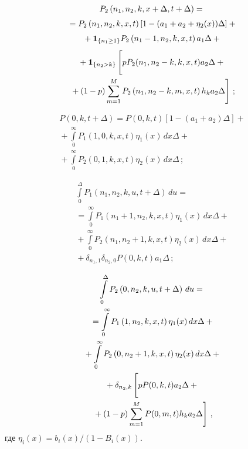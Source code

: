 \begin{multicols}{2}
\vspace*{-10pt}

\noindent
\begin{multline}
P_2\left(n_1,n_2,k,x+\Delta,t+\Delta\right)={}\\[3pt]
{}=
P_2\left(n_1,n_2,k,x,t\right)\left[1-(a_1+a_2+\eta_2(x))\Delta\right]+{}\\[3pt]
{}+\mathbf{1}_{\{n_1\geq 1\}}P_2\left(n_1-1,n_2,k,x,t\right)a_1\Delta+{}\\[3pt]
{}+\mathbf{1}_{\{n_2>k\}}\left[
\vphantom{\sum\limits_{m=1}^{M}}
pP_2(n_1,n_2-k,k,x,t)a_2\Delta+{}\right.\\
\left.{}+(1-p)
\sum\limits_{m=1}^{M}P_2\left(n_1,n_2-k,m,x,t\right)h_k a_2\Delta\right]\,;
\label{before2}
\end{multline}

\vspace*{-10pt}

\noindent
\begin{multline}
P\left(0,k,t+\Delta\right)=
P(0,k,t)\left[1-\left(a_1+a_2\right)\Delta\right]+{}\\
{}+
\int\limits_0^{\infty}P_1(1,0,k,x,t)\eta_1(x)\,dx\Delta+{}\\
{}+\int\limits_0^{\infty}P_2(0,1,k,x,t)\eta_2(x)\,dx\Delta\,;
\label{before3}
\end{multline}

\vspace*{-10pt}

\noindent
\begin{multline}
\int\limits_0^\Delta P_1\left(n_1,n_2,k,u,t+\Delta\right)\,du={}\\
{}=
\int\limits_0^{\infty}P_1\left(n_1+1,n_2,k,x,t\right)\eta_1(x)\,dx\Delta+{}\\
{}+\int\limits_0^{\infty}P_2\left(n_1,n_2+1,k,x,t\right)\eta_2(x)\,dx\Delta+{}\\
{}+
\delta_{n_1,1}\delta_{n_2,0}P(0,k,t)a_1\Delta\,;
\label{before4}
\end{multline}


\noindent
\begin{multline}
\int\limits_0^\Delta P_2\left(0,n_2,k,u,t+\Delta\right)\,du={}\\
{}=
\int\limits_0^{\infty}P_1\left(1,n_2,k,x,t\right)\eta_1(x)\,dx\Delta+{}
\\
{}+\int\limits_0^{\infty}P_2\left(0,n_2+1,k,x,t\right)\eta_2(x)\,dx\Delta+{}\\
{}+
\delta_{n_2,k}\left[
\vphantom{\sum\limits_{m=1}^{M}}
pP(0,k,t)a_2\Delta+{}\right.\\
\left.{}+(1-p)\sum\limits_{m=1}^{M}
P(0,m,t)h_k a_2\Delta\right]\,,
\label{before5}
\end{multline}
где $\eta_i(x)=b_i(x)/(1-B_i(x))$.


\end{multicols}
